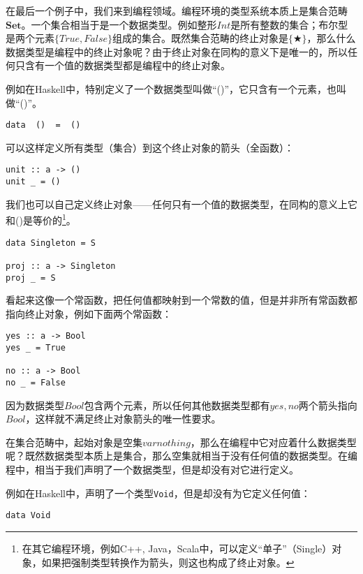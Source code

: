 \documentclass{article}
\begin{document}
\begin{example}
在最后一个例子中，我们来到编程领域。编程环境的类型系统本质上是集合范畴$\pmb{Set}$。一个集合相当于是一个数据类型。例如整形$Int$是所有整数的集合；布尔型是两个元素$\{True, False\}$组成的集合。既然集合范畴的终止对象是$\{ \bigstar \}$，那么什么数据类型是编程中的终止对象呢？由于终止对象在同构的意义下是唯一的，所以任何只含有一个值的数据类型都是编程中的终止对象。

例如在Haskell中，特别定义了一个数据类型叫做“()”，它只含有一个元素，也叫做“()”。

\begin{lstlisting}
data  ()  =  ()
\end{lstlisting}

可以这样定义所有类型（集合）到这个终止对象的箭头（全函数）：

\begin{lstlisting}
unit :: a -> ()
unit _ = ()
\end{lstlisting}

我们也可以自己定义终止对象——任何只有一个值的数据类型，在同构的意义上它和()是等价的\footnote{在其它编程环境，例如C++, Java，Scala中，可以定义“单子”（Single）对象，如果把强制类型转换作为箭头，则这也构成了终止对象。}。

\begin{lstlisting}
data Singleton = S

proj :: a -> Singleton
proj _ = S
\end{lstlisting}

看起来这像一个常函数，把任何值都映射到一个常数的值，但是并非所有常函数都指向终止对象，例如下面两个常函数：

\begin{lstlisting}
yes :: a -> Bool
yes _ = True

no :: a -> Bool
no _ = False
\end{lstlisting}

因为数据类型$Bool$包含两个元素，所以任何其他数据类型都有$yes, no$两个箭头指向$Bool$，这样就不满足终止对象箭头的唯一性要求。

在集合范畴中，起始对象是空集$varnothing$，那么在编程中它对应着什么数据类型呢？既然数据类型本质上是集合，那么空集就相当于没有任何值的数据类型。在编程中，相当于我们声明了一个数据类型，但是却没有对它进行定义。

例如在Haskell中，声明了一个类型\texttt{Void}，但是却没有为它定义任何值：

\begin{lstlisting}
data Void
\end{lstlisting}


\end{example}
\end{document}

